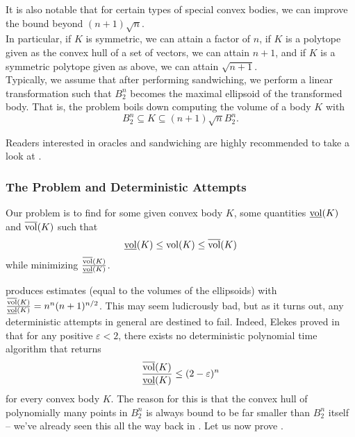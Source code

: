 

It is also notable that for certain types of special convex bodies, we can improve the bound beyond $(n+1)\sqrt{n}$.\\
In particular, if $K$ is symmetric, we can attain a factor of $n$, if $K$ is a polytope given as the convex hull of a set of vectors, we can attain $n+1$, and if $K$ is a symmetric polytope given as above, we can attain $\sqrt{n+1}$.\\

Typically, we assume that after performing sandwiching, we perform a linear transformation such that $B_2^n$ becomes the maximal ellipsoid of the transformed body. That is, the problem boils down computing the volume of a body $K$ with
\[ B_2^n \subseteq K \subseteq (n+1)\sqrt{n} B_2^n. \]

Readers interested in oracles and sandwiching are highly recommended to take a look at \cite{GroetschelLovaszSchrijver1993}.

\subsubsection{The Problem and Deterministic Attempts}

Our problem is to find for some given convex body $K$, some quantities $\underline{\operatorname{vol}}(K)$ and $\overline{\operatorname{vol}}(K)$ such that
\[ \underline{\operatorname{vol}}(K) \leq \operatorname{vol}(K) \leq \overline{\operatorname{vol}}(K) \]
while minimizing $\frac{\overline{\operatorname{vol}}(K)}{\underline{\operatorname{vol}}(K)}$.

 produces estimates (equal to the volumes of the ellipsoids) with $\frac{\overline{\operatorname{vol}}(K)}{\underline{\operatorname{vol}}(K)} = n^n (n+1)^{n/2}$. This may seem ludicrously bad, but as it turns out, any deterministic attempts in general are destined to fail. Indeed, Elekes proved in \cite{Elekes1986} that for any positive $\varepsilon<2$, there exists no deterministic polynomial time algorithm that returns
\begin{equation}
\label{eqn elekes deterministic SUCKS}
	\frac{\overline{\operatorname{vol}}(K)}{\underline{\operatorname{vol}}(K)} \leq (2-\varepsilon)^n
\end{equation}
for every convex body $K$. The reason for this is that the convex hull of polynomially many points in $B_2^n$ is always bound to be far smaller than $B_2^n$ itself -- we've already seen this all the way back in . Let us now prove .

